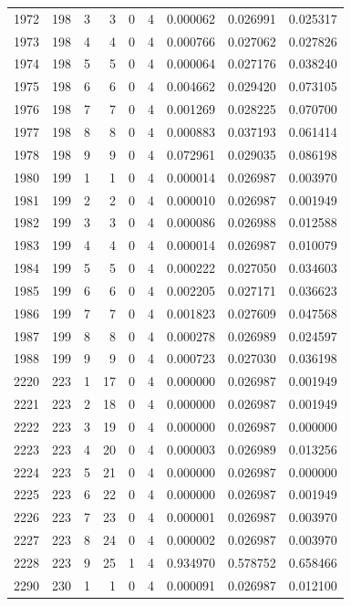 \begin{longtable}{rrrrrrrrr}
1972 & 198 & 3 & 3 & 0 & 4 & 0.000062 & 0.026991 & 0.025317 \\
1973 & 198 & 4 & 4 & 0 & 4 & 0.000766 & 0.027062 & 0.027826 \\
1974 & 198 & 5 & 5 & 0 & 4 & 0.000064 & 0.027176 & 0.038240 \\
1975 & 198 & 6 & 6 & 0 & 4 & 0.004662 & 0.029420 & 0.073105 \\
1976 & 198 & 7 & 7 & 0 & 4 & 0.001269 & 0.028225 & 0.070700 \\
1977 & 198 & 8 & 8 & 0 & 4 & 0.000883 & 0.037193 & 0.061414 \\
1978 & 198 & 9 & 9 & 0 & 4 & 0.072961 & 0.029035 & 0.086198 \\
1980 & 199 & 1 & 1 & 0 & 4 & 0.000014 & 0.026987 & 0.003970 \\
1981 & 199 & 2 & 2 & 0 & 4 & 0.000010 & 0.026987 & 0.001949 \\
1982 & 199 & 3 & 3 & 0 & 4 & 0.000086 & 0.026988 & 0.012588 \\
1983 & 199 & 4 & 4 & 0 & 4 & 0.000014 & 0.026987 & 0.010079 \\
1984 & 199 & 5 & 5 & 0 & 4 & 0.000222 & 0.027050 & 0.034603 \\
1985 & 199 & 6 & 6 & 0 & 4 & 0.002205 & 0.027171 & 0.036623 \\
1986 & 199 & 7 & 7 & 0 & 4 & 0.001823 & 0.027609 & 0.047568 \\
1987 & 199 & 8 & 8 & 0 & 4 & 0.000278 & 0.026989 & 0.024597 \\
1988 & 199 & 9 & 9 & 0 & 4 & 0.000723 & 0.027030 & 0.036198 \\
2220 & 223 & 1 & 17 & 0 & 4 & 0.000000 & 0.026987 & 0.001949 \\
2221 & 223 & 2 & 18 & 0 & 4 & 0.000000 & 0.026987 & 0.001949 \\
2222 & 223 & 3 & 19 & 0 & 4 & 0.000000 & 0.026987 & 0.000000 \\
2223 & 223 & 4 & 20 & 0 & 4 & 0.000003 & 0.026989 & 0.013256 \\
2224 & 223 & 5 & 21 & 0 & 4 & 0.000000 & 0.026987 & 0.000000 \\
2225 & 223 & 6 & 22 & 0 & 4 & 0.000000 & 0.026987 & 0.001949 \\
2226 & 223 & 7 & 23 & 0 & 4 & 0.000001 & 0.026987 & 0.003970 \\
2227 & 223 & 8 & 24 & 0 & 4 & 0.000002 & 0.026987 & 0.003970 \\
2228 & 223 & 9 & 25 & 1 & 4 & 0.934970 & 0.578752 & 0.658466 \\
2290 & 230 & 1 & 1 & 0 & 4 & 0.000091 & 0.026987 & 0.012100 \\

\end{longtable}
